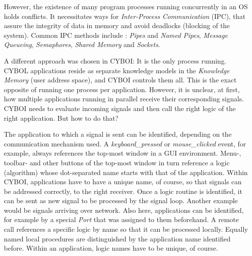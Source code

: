 However, the existence of many program processes running concurrently in an OS
holds conflicts. It necessitates ways for \emph{Inter-Process Communication}
(IPC), that assure the integrity of data in memory and avoid deadlocks
(blocking of the system). Common IPC methods include \cite{ipc, tanenbaum2001}:
\emph{Pipes} and \emph{Named Pipes}, \emph{Message Queueing}, \emph{Semaphores},
\emph{Shared Memory} and \emph{Sockets}.

A different approach was chosen in CYBOI: It is the only process running. CYBOL
applications reside as separate knowledge models in the \emph{Knowledge Memory}
(user address space), and CYBOI controls them all. This is the exact opposite
of running one process per application. However, it is unclear, at first, how
multiple applications running in parallel receive their corresponding signals.
CYBOI needs to evaluate incoming signals and then call the right logic of the
right application. But how to do that?

The application to which a signal is sent can be identified, depending on the
communication mechanism used. A \emph{keyboard\_pressed} or \emph{mouse\_clicked}
event, for example, always references the top-most window in a GUI environment.
Menu-, toolbar- and other buttons of the top-most window in turn reference a
logic (algorithm) whose dot-separated name starts with that of the application.
Within CYBOI, applications have to have a unique name, of course, so that
signals can be addressed correctly, to the right receiver. Once a logic routine
is identified, it can be sent as new signal to be processed by the signal loop.
Another example would be signals arriving over network. Also here, applications
can be identified, for example by a special \emph{Port} that was assigned to
them beforehand. A remote call references a specific logic by name so that it
can be processed locally. Equally named local procedures are distinguished by
the application name identified before. Within an application, logic names have
to be unique, of course.
